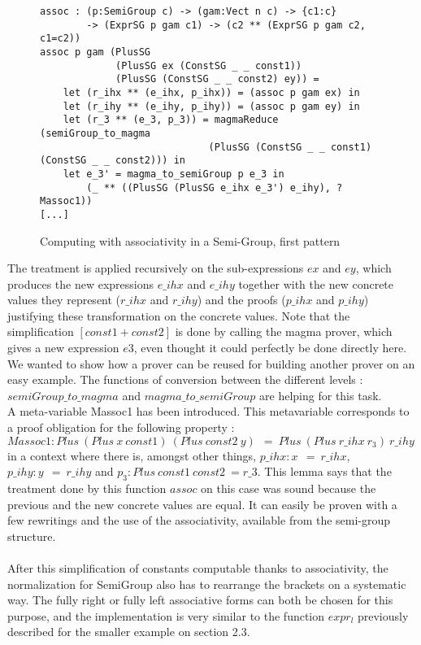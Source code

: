 \begin{figure}[H]
\figrule
\begin{center}
\begin{verbatim}
assoc : (p:SemiGroup c) -> (gam:Vect n c) -> {c1:c} 
        -> (ExprSG p gam c1) -> (c2 ** (ExprSG p gam c2, c1=c2))
assoc p gam (PlusSG 
             (PlusSG ex (ConstSG _ _ const1)) 
             (PlusSG (ConstSG _ _ const2) ey)) =
    let (r_ihx ** (e_ihx, p_ihx)) = (assoc p gam ex) in
    let (r_ihy ** (e_ihy, p_ihy)) = (assoc p gam ey) in
    let (r_3 ** (e_3, p_3)) = magmaReduce (semiGroup_to_magma 
                             (PlusSG (ConstSG _ _ const1) (ConstSG _ _ const2))) in
    let e_3' = magma_to_semiGroup p e_3 in
        (_ ** ((PlusSG (PlusSG e_ihx e_3') e_ihy), ?Massoc1))
[...]
\end{verbatim}
\end{center}
\caption{Computing with associativity in a Semi-Group, first pattern}
\figrule
\end{figure}
The treatment is applied recursively on the sub-expressions $ex$ and $ey$, which produces the new expressions $e\_ihx$ and $e\_ihy$ together with the new concrete values they represent ($r\_ihx$ and $r\_ihy$) and the proofs ($p\_ihx$ and $p\_ihy$) justifying these transformation on the concrete values. Note that the simplification $[const1+const2]$ is done by calling the magma prover, which gives a new expression $e3$, even thought it could perfectly be done directly here. We wanted to show how a prover can be reused for building another prover on an easy example. The functions of conversion between the different levels : $semiGroup\_to\_magma$ and $magma\_to\_semiGroup$ are helping for this task.
\\
A meta-variable Massoc1 has been introduced. This metavariable corresponds to a proof obligation for the following property :
$Massoc1 : Plus\ (Plus\ x\ const1)\ (Plus\ const2\ y)\ ~=\ Plus\ (Plus\ r\_ihx\ r_3)\ r\_ihy$ in a context where there is, amongst other things, $p\_ihx : x\ ~=\ r\_ihx$, $p\_ihy : y\ ~=\ r\_ihy$ and $p_3 : Plus\ const1\ const2 ~= r\_3$.
This lemma says that the treatment done by this function $assoc$ on this case was sound because the previous and the new concrete values are equal. It can easily be proven with a few rewritings and the use of the associativity, available from the semi-group structure. \\
\\
After this simplification of constants computable thanks to associativity, the normalization for SemiGroup also has to rearrange the brackets on a systematic way. The fully right or fully left associative forms can both be chosen for this purpose, and the implementation is very similar to the function $expr_l$ previously described for the smaller example on section 2.3.

